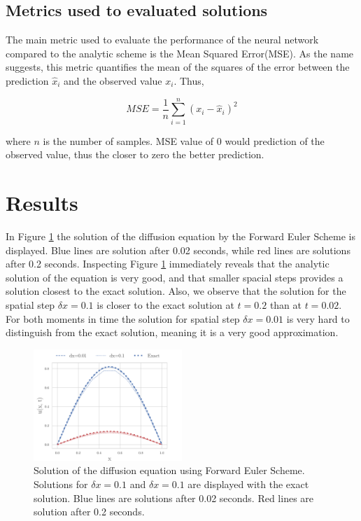 \documentclass[a4paper,11pt,twocolumn]{article}
\begin{document}
\subsection{Metrics used to evaluated solutions}

The main metric used to evaluate the performance of the neural network compared to the analytic scheme is the Mean Squared Error(MSE). As the name suggests, this metric quantifies the mean of the squares of the error between the prediction $\hat{x}_i$ and the observed value $x_i$. Thus, 

\begin{equation*}
MSE = \frac{1}{n}\sum_{i=1}^n (x_i - \hat{x}_i)^2
\end{equation*}

where $n$ is the number of samples. MSE value of 0 would prediction of the observed value, thus the closer to zero the better prediction.  
 


\section{Results}

In Figure \ref{euler} the solution of the diffusion equation by the Forward Euler Scheme is displayed. Blue lines are solution after 0.02 seconds, while red lines are solutions after 0.2 seconds. Inspecting Figure \ref{euler} immediately reveals that the analytic solution of the equation is very good, and that smaller spacial steps provides a solution closest to the exact solution. Also, we observe that the solution for the spatial step $\delta x = 0.1$ is closer to the exact solution at $t = 0.2$ than at $t = 0.02$. For both moments in time the solution for spatial step $\delta x = 0.01$ is very hard to distinguish from the exact solution, meaning it is a very good approximation. 
\begin{figure}[h]
	\centering 
	\includegraphics[width=0.5\textwidth]{figures/euler}
	\caption{Solution of the diffusion equation using Forward Euler Scheme. Solutions for $\delta x = 0.1$ and $\delta x = 0.1$ are displayed with the exact solution. Blue lines are solutions after 0.02 seconds. Red lines are solution after 0.2 seconds.}
	\label{euler}
\end{figure}
\end{document}
